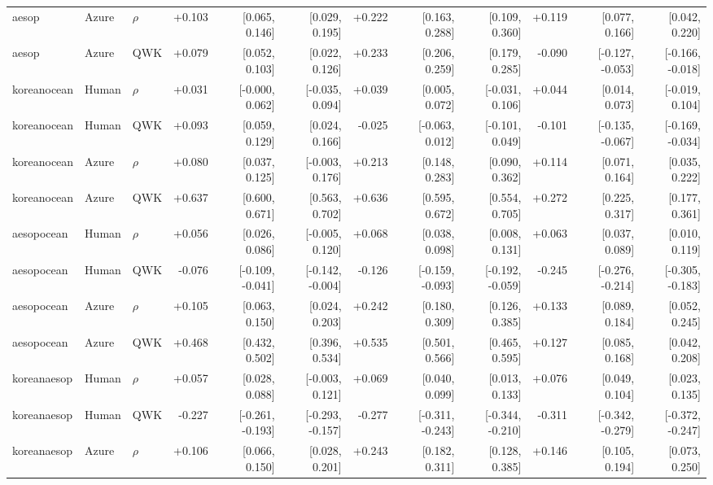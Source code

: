 \begin{landscape}
\begin{longtable}{@{}lllrrrrrrrrr@{}}
aesop & Azure & $\rho$ & +0.103 & [0.065, 0.146] & [0.029, 0.195] & +0.222 & [0.163, 0.288] & [0.109, 0.360] & +0.119 & [0.077, 0.166] & [0.042, 0.220]\\
aesop & Azure & QWK & +0.079 & [0.052, 0.103] & [0.022, 0.126] & +0.233 & [0.206, 0.259] & [0.179, 0.285] & -0.090 & [-0.127, -0.053] & [-0.166, -0.018]\\
\addlinespace[2pt]
koreanocean & Human & $\rho$ & +0.031 & [-0.000, 0.062] & [-0.035, 0.094] & +0.039 & [0.005, 0.072] & [-0.031, 0.106] & +0.044 & [0.014, 0.073] & [-0.019, 0.104]\\
koreanocean & Human & QWK & +0.093 & [0.059, 0.129] & [0.024, 0.166] & -0.025 & [-0.063, 0.012] & [-0.101, 0.049] & -0.101 & [-0.135, -0.067] & [-0.169, -0.034]\\
koreanocean & Azure & $\rho$ & +0.080 & [0.037, 0.125] & [-0.003, 0.176] & +0.213 & [0.148, 0.283] & [0.090, 0.362] & +0.114 & [0.071, 0.164] & [0.035, 0.222]\\
koreanocean & Azure & QWK & +0.637 & [0.600, 0.671] & [0.563, 0.702] & +0.636 & [0.595, 0.672] & [0.554, 0.705] & +0.272 & [0.225, 0.317] & [0.177, 0.361]\\
\addlinespace[2pt]
aesopocean & Human & $\rho$ & +0.056 & [0.026, 0.086] & [-0.005, 0.120] & +0.068 & [0.038, 0.098] & [0.008, 0.131] & +0.063 & [0.037, 0.089] & [0.010, 0.119]\\
aesopocean & Human & QWK & -0.076 & [-0.109, -0.041] & [-0.142, -0.004] & -0.126 & [-0.159, -0.093] & [-0.192, -0.059] & -0.245 & [-0.276, -0.214] & [-0.305, -0.183]\\
aesopocean & Azure & $\rho$ & +0.105 & [0.063, 0.150] & [0.024, 0.203] & +0.242 & [0.180, 0.309] & [0.126, 0.385] & +0.133 & [0.089, 0.184] & [0.052, 0.245]\\
aesopocean & Azure & QWK & +0.468 & [0.432, 0.502] & [0.396, 0.534] & +0.535 & [0.501, 0.566] & [0.465, 0.595] & +0.127 & [0.085, 0.168] & [0.042, 0.208]\\
\addlinespace[2pt]
koreanaesop & Human & $\rho$ & +0.057 & [0.028, 0.088] & [-0.003, 0.121] & +0.069 & [0.040, 0.099] & [0.013, 0.133] & +0.076 & [0.049, 0.104] & [0.023, 0.135]\\
koreanaesop & Human & QWK & -0.227 & [-0.261, -0.193] & [-0.293, -0.157] & -0.277 & [-0.311, -0.243] & [-0.344, -0.210] & -0.311 & [-0.342, -0.279] & [-0.372, -0.247]\\
koreanaesop & Azure & $\rho$ & +0.106 & [0.066, 0.150] & [0.028, 0.201] & +0.243 & [0.182, 0.311] & [0.128, 0.385] & +0.146 & [0.105, 0.194] & [0.073, 0.250]\\

\end{longtable}
\end{landscape}
